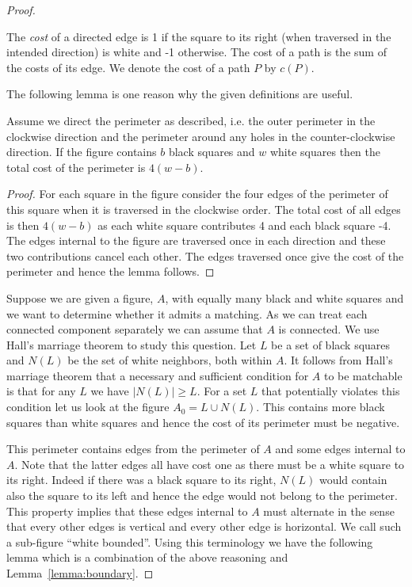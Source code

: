 \documentclass{theoretics}
\begin{document}
\begin{proof}
\begin{definition}
The {\em cost} of a directed edge is 1 if the square to its
right (when traversed in the intended direction) is white
and -1 otherwise.  The cost of a path is the sum
of the costs of its edge.  We denote the cost of
a path $P$ by $c(P)$.
\end{definition}

The following lemma is one reason why the given
definitions are useful.

\begin{lemma}\label{lemma:boundary}
Assume we direct the perimeter as described, i.e.
the outer perimeter in the clockwise direction and
the perimeter around any holes in the counter-clockwise
direction.  If the figure contains
$b$ black squares and $w$ white squares
then the total cost of the perimeter is $4(w-b)$.
\end{lemma}

\begin{proof}
For each square in the figure consider
the four edges of the perimeter of this
square when it is traversed in
the clockwise order.   The total cost
of all edges is then $4(w-b)$ as each white square contributes
4 and each black square -4.  The 
edges internal to the figure are traversed once
in each direction and these two contributions
cancel each other.  The edges traversed once
give the cost of the perimeter and hence
the lemma follows.
\end{proof}

Suppose we are given a figure, $A$, with equally many
black and white squares and we want to determine
whether it admits a matching.  As we can treat
each connected component separately we can assume
that $A$ is connected.
We use Hall's marriage theorem to
study this question.  Let $L$ be a set of
black squares and $N(L)$ be the set of white
neighbors, both within $A$.  It follows from 
Hall's marriage theorem that a necessary and sufficient
condition for $A$ to be matchable is that for any $L$ we have $|N(L)| \geq L$.
For a set $L$ that potentially violates this condition let us
look at the figure $A_0=L \cup N(L)$.  This contains
more black squares than white squares and hence
the cost of its perimeter must be negative.

This perimeter contains edges from the perimeter
of $A$ and some edges internal to $A$.  Note that the 
latter edges all have cost one as there must be a white
square to its right.  Indeed if there was a black square
to its right, $N(L)$ would contain also the square to its left
and hence the edge would not belong to the perimeter.
This property implies that these edges internal to
$A$ must alternate in the sense that every other
edges is vertical and every other edge is horizontal.
We call such a sub-figure ``white bounded''.  Using this
terminology we have the following lemma which is a combination
of the above reasoning and Lemma~\ref{lemma:boundary}.


\end{proof}
\end{document}
